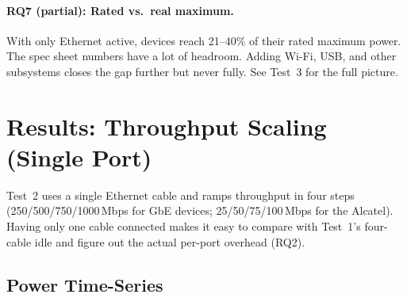 \paragraph{RQ7 (partial): Rated vs.\ real maximum.}
With only Ethernet active, devices reach 21--40\% of their rated maximum power. The spec sheet numbers have a lot of headroom.
Adding Wi-Fi, \ac{USB}, and other subsystems closes the gap further but never fully. See Test~3 for the full picture.

\section{Results: Throughput Scaling (Single Port)}
\label{sec:results-throughput-scaling}

Test~2 uses a single Ethernet cable and ramps throughput in four steps (250/500/750/1000\,Mbps for \ac{GbE} devices; 25/50/75/100\,Mbps for the Alcatel).
Having only one cable connected makes it easy to compare with Test~1's four-cable idle and figure out the actual per-port overhead (RQ2).

\subsection{Power Time-Series}
\label{sec:test2-power-over-time}

